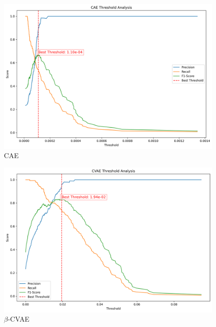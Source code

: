 \begin{figure}[!h]
  \centering
  \includegraphics[scale=0.5]{figures/anomalies/cae/threshold.png}
  \caption{CAE}
  \label{fig:threshold_cae}
\end{figure}

\begin{figure}[!h]
  \centering
  \includegraphics[scale=0.5]{figures/anomalies/cvae/threshold.png}
  \caption{$\beta$-CVAE}
  \label{fig:threshold_vae}
\end{figure}

